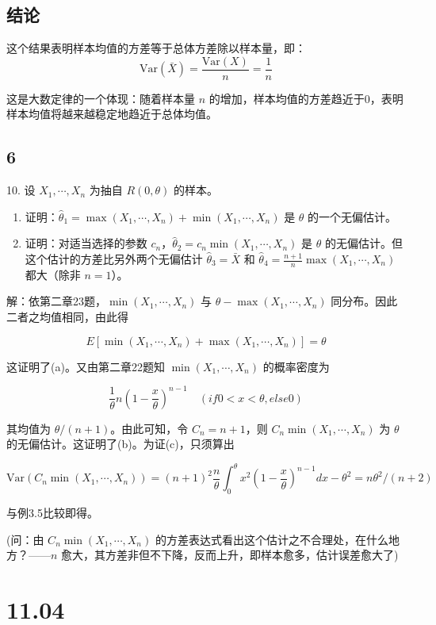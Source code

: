 \documentclass[UTF8]{report}
\theoremstyle{MyLineTheoremStyle} %
\theoremstyle{MyBlockTheoremStyle} %
\theoremstyle{MySubsubsectionStyle} %
\begin{document}
\subsection*{结论}
这个结果表明样本均值的方差等于总体方差除以样本量，即：
$$
\text{Var}(\bar{X}) = \frac{\text{Var}(X)}{n} = \frac{1}{n}
$$

这是大数定律的一个体现：随着样本量 $n$ 的增加，样本均值的方差趋近于0，表明样本均值将越来越稳定地趋近于总体均值。







\subsection{6}
10. 设 $X_1,\cdots,X_n$ 为抽自 $R(0,\theta)$ 的样本。
\begin{enumerate}
\item 证明：$\hat{\theta}_1=\max(X_1,\cdots,X_n)+\min(X_1,\cdots,X_n)$ 是 $\theta$ 的一个无偏估计。

\item 证明：对适当选择的参数 $c_n$，$\hat{\theta}_2=c_n\min(X_1,\cdots,X_n)$ 是 $\theta$ 的无偏估计。但这个估计的方差比另外两个无偏估计 $\hat{\theta}_3=\bar{X}$ 和 $\hat{\theta}_4=\frac{n+1}{n}\max(X_1,\cdots,X_n)$ 都大（除非 $n=1$）。
\end{enumerate}

解：依第二章23题，$\min(X_1,\cdots,X_n)$ 与 $\theta-\max(X_1,\cdots,X_n)$ 同分布。因此二者之均值相同，由此得

$$E[\min(X_1,\cdots,X_n)+\max(X_1,\cdots,X_n)]=\theta$$

这证明了(a)。又由第二章22题知 $\min(X_1,\cdots,X_n)$ 的概率密度为

$$\frac{1}{\theta}n\left(1-\frac{x}{\theta}\right)^{n-1} \quad (if 0<x<\theta, else0)$$

其均值为 $\theta/(n+1)$。由此可知，令 $C_n=n+1$，则 $C_n\min(X_1,\cdots,X_n)$ 为 $\theta$ 的无偏估计。这证明了(b)。为证(c)，只须算出

$$\text{Var}(C_n\min(X_1,\cdots,X_n))=(n+1)^2\frac{n}{\theta}\int_0^\theta x^2\left(1-\frac{x}{\theta}\right)^{n-1}dx-\theta^2=n\theta^2/(n+2)$$

与例3.5比较即得。

(问：由 $C_n\min(X_1,\cdots,X_n)$ 的方差表达式看出这个估计之不合理处，在什么地方？——$n$ 愈大，其方差非但不下降，反而上升，即样本愈多，估计误差愈大了)



\section{11.04}
\end{document}
